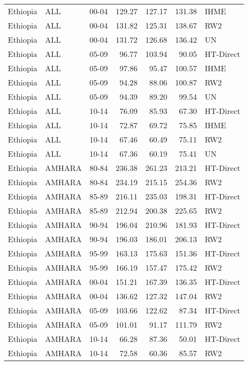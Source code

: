 \begin{longtable}{lllrrrl}
  Ethiopia & ALL & 00-04 & 129.27 & 127.17 & 131.38 & IHME \\ 
  Ethiopia & ALL & 00-04 & 131.82 & 125.31 & 138.67 & RW2 \\ 
  Ethiopia & ALL & 00-04 & 131.72 & 126.68 & 136.42 & UN \\ 
  Ethiopia & ALL & 05-09 & 96.77 & 103.94 & 90.05 & HT-Direct \\ 
  Ethiopia & ALL & 05-09 & 97.86 & 95.47 & 100.57 & IHME \\ 
  Ethiopia & ALL & 05-09 & 94.28 & 88.06 & 100.87 & RW2 \\ 
  Ethiopia & ALL & 05-09 & 94.39 & 89.20 & 99.54 & UN \\ 
  Ethiopia & ALL & 10-14 & 76.09 & 85.93 & 67.30 & HT-Direct \\ 
  Ethiopia & ALL & 10-14 & 72.87 & 69.72 & 75.85 & IHME \\ 
  Ethiopia & ALL & 10-14 & 67.46 & 60.49 & 75.11 & RW2 \\ 
  Ethiopia & ALL & 10-14 & 67.36 & 60.19 & 75.41 & UN \\ 
  Ethiopia & AMHARA & 80-84 & 236.38 & 261.23 & 213.21 & HT-Direct \\ 
  Ethiopia & AMHARA & 80-84 & 234.19 & 215.15 & 254.36 & RW2 \\ 
  Ethiopia & AMHARA & 85-89 & 216.11 & 235.03 & 198.31 & HT-Direct \\ 
  Ethiopia & AMHARA & 85-89 & 212.94 & 200.38 & 225.65 & RW2 \\ 
  Ethiopia & AMHARA & 90-94 & 196.04 & 210.96 & 181.93 & HT-Direct \\ 
  Ethiopia & AMHARA & 90-94 & 196.03 & 186.01 & 206.13 & RW2 \\ 
  Ethiopia & AMHARA & 95-99 & 163.13 & 175.63 & 151.36 & HT-Direct \\ 
  Ethiopia & AMHARA & 95-99 & 166.19 & 157.47 & 175.42 & RW2 \\ 
  Ethiopia & AMHARA & 00-04 & 151.21 & 167.39 & 136.35 & HT-Direct \\ 
  Ethiopia & AMHARA & 00-04 & 136.62 & 127.32 & 147.04 & RW2 \\ 
  Ethiopia & AMHARA & 05-09 & 103.66 & 122.62 & 87.34 & HT-Direct \\ 
  Ethiopia & AMHARA & 05-09 & 101.01 & 91.17 & 111.79 & RW2 \\ 
  Ethiopia & AMHARA & 10-14 & 66.28 & 87.36 & 50.01 & HT-Direct \\ 
  Ethiopia & AMHARA & 10-14 & 72.58 & 60.36 & 85.57 & RW2 \\ 

\end{longtable}
